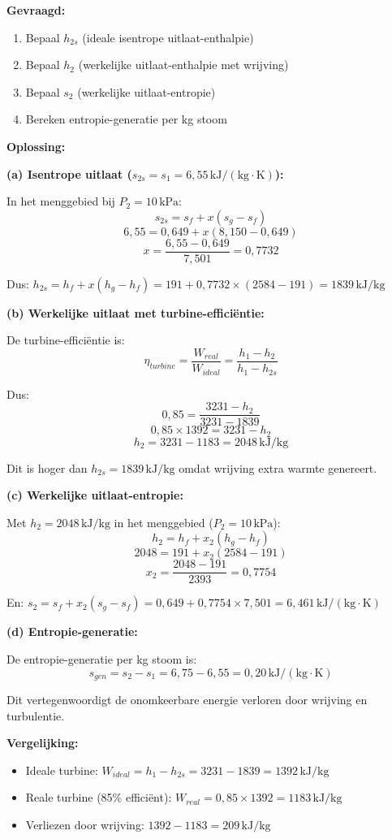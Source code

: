 \documentclass[a4paper,11pt,twoside]{report}
\begin{document}
\textbf{Gevraagd:}
\begin{enumerate}
    \item Bepaal $h_{2s}$ (ideale isentrope uitlaat-enthalpie)
    \item Bepaal $h_2$ (werkelijke uitlaat-enthalpie met wrijving)
    \item Bepaal $s_2$ (werkelijke uitlaat-entropie)
    \item Bereken entropie-generatie per kg stoom
\end{enumerate}

\textbf{Oplossing:}

\textbf{(a) Isentrope uitlaat ($s_{2s} = s_1 = 6,55\,\mathrm{kJ/(kg \cdot K)}$):}

In het menggebied bij $P_2 = 10\,\mathrm{kPa}$:
\[
s_{2s} = s_f + x(s_g - s_f)
\]
\[
6,55 = 0,649 + x(8,150 - 0,649)
\]
\[
x = \frac{6,55 - 0,649}{7,501} = 0,7732
\]

Dus: $h_{2s} = h_f + x(h_g - h_f) = 191 + 0,7732 \times (2584 - 191) = 1839\,\mathrm{kJ/kg}$

\textbf{(b) Werkelijke uitlaat met turbine-efficiëntie:}

De turbine-efficiëntie is:
\[
\eta_{turbine} = \frac{W_{real}}{W_{ideal}} = \frac{h_1 - h_2}{h_1 - h_{2s}}
\]

Dus:
\[
0,85 = \frac{3231 - h_2}{3231 - 1839}
\]
\[
0,85 \times 1392 = 3231 - h_2
\]
\[
h_2 = 3231 - 1183 = 2048\,\mathrm{kJ/kg}
\]

Dit is hoger dan $h_{2s} = 1839\,\mathrm{kJ/kg}$ omdat wrijving extra warmte genereert.

\textbf{(c) Werkelijke uitlaat-entropie:}

Met $h_2 = 2048\,\mathrm{kJ/kg}$ in het menggebied ($P_2 = 10\,\mathrm{kPa}$):
\[
h_2 = h_f + x_2(h_g - h_f)
\]
\[
2048 = 191 + x_2(2584 - 191)
\]
\[
x_2 = \frac{2048 - 191}{2393} = 0,7754
\]

En: $s_2 = s_f + x_2(s_g - s_f) = 0,649 + 0,7754 \times 7,501 = 6,461\,\mathrm{kJ/(kg \cdot K)}$

\textbf{(d) Entropie-generatie:}

De entropie-generatie per kg stoom is:
\[
s_{gen} = s_2 - s_1 = 6,75 - 6,55 = 0,20\,\mathrm{kJ/(kg \cdot K)}
\]

Dit vertegenwoordigt de onomkeerbare energie verloren door wrijving en turbulentie.

\textbf{Vergelijking:}
\begin{itemize}
    \item Ideale turbine: $W_{ideal} = h_1 - h_{2s} = 3231 - 1839 = 1392\,\mathrm{kJ/kg}$
    \item Reale turbine (85\% efficiënt): $W_{real} = 0,85 \times 1392 = 1183\,\mathrm{kJ/kg}$
    \item Verliezen door wrijving: $1392 - 1183 = 209\,\mathrm{kJ/kg}$
\end{itemize}
\end{document}
